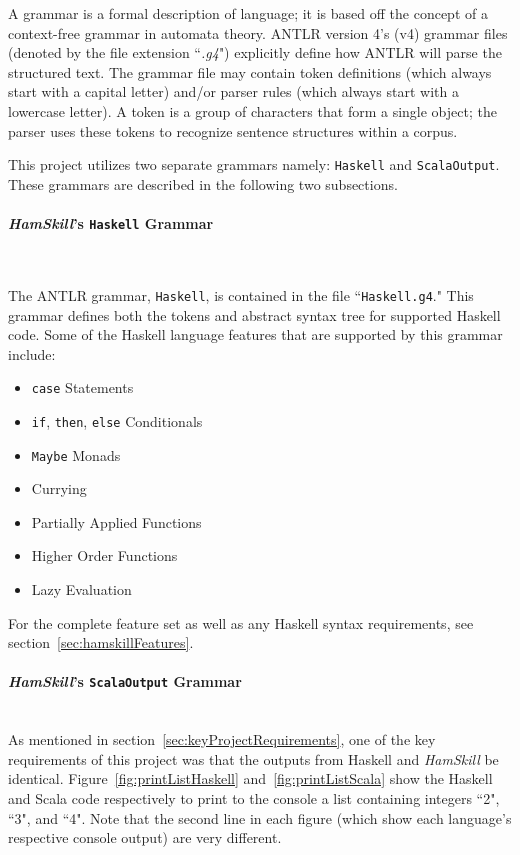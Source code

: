 \documentclass{report}
\newcommand{\myparagraph}[1]{\paragraph{#1}\mbox{}\\}
\begin{document}
A grammar is a formal description of language; it is based off the concept of a context-free grammar in automata theory.  ANTLR version 4's (v4) grammar files (denoted by the file extension ``\emph{.g4}") explicitly define how ANTLR will parse the structured text.  The grammar file may contain token definitions (which always start with a capital letter) and/or parser rules (which always start with a lowercase letter).  A token is a group of characters that form a single object; the parser uses these tokens to recognize sentence structures within a corpus.

This project utilizes two separate grammars namely: \texttt{Haskell} and \texttt{ScalaOutput}.  These grammars are described in the following two subsections.

\myparagraph{\textit{HamSkill}'s \texttt{Haskell} Grammar}\label{sec:haskellG4}

The ANTLR grammar, \texttt{Haskell}, is contained in the file ``\texttt{Haskell.g4}."  This grammar defines both the tokens and abstract syntax tree for supported Haskell code.  Some of the Haskell language features that are supported by this grammar include:

\begin{itemize}
   \item \texttt{case} Statements
   \item \texttt{if}, \texttt{then}, \texttt{else} Conditionals
   \item \texttt{Maybe} Monads
   \item Currying
   \item Partially Applied Functions
   \item Higher Order Functions
   \item Lazy Evaluation
\end{itemize}

For the complete feature set as well as any Haskell syntax requirements, see section~\ref{sec:hamskillFeatures}.

\myparagraph{\textit{HamSkill}'s \texttt{ScalaOutput} Grammar} 

As mentioned in section~\ref{sec:keyProjectRequirements}, one of the key requirements of this project was that the outputs from Haskell and \textit{HamSkill} be identical.  Figure~\ref{fig:printListHaskell} and~\ref{fig:printListScala} show the Haskell and Scala code respectively to print to the console a list containing integers ``2", ``3", and ``4".  Note that the second line in each figure (which show each language's respective console output) are very different.
\end{document}
